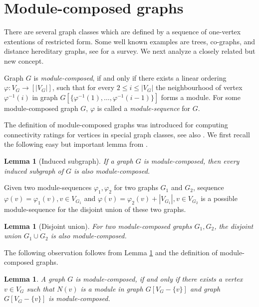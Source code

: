 \documentclass[11pt]{article}
\newtheorem{lemma}[theorem]{Lemma}
\begin{document}
\section{Module-composed graphs}



There are several graph classes which are defined by a sequence of one-vertex
extentions of restricted form. Some well known examples are trees, co-graphs,
and distance hereditary graphs, see \cite{Rao07} for a survey. We next analyze
a closely related but new concept.

Graph $G$ is {\em module-composed}, if and only if there exists a linear 
ordering $\varphi:V_G \to [|V_G|]$, such that for every $2\leq i\leq|V_G|$ the 
neighbourhood of vertex $\varphi^{-1}(i)$ in graph 
$G[\{\varphi^{-1}(1),\ldots,\varphi^{-1}(i-1)\}]$ forms a module. 
For some module-composed graph $G$, $\varphi$ is called a {\em module-sequence} for $G$.

The definition of module-composed graphs
was introduced \cite{AGKKW06} for computing
connectivity ratings for vertices in special graph classes, 
see also \cite{AKKW06}.
We first recall the following easy but important lemma from \cite{AGKKW06}.

\begin{lemma}[Induced subgraph]\label{Li}
If a graph $G$ is module-composed, then every induced subgraph of $G$ is also 
module-composed.
\end{lemma}

Given two module-sequences $\varphi_1,\varphi_2$ for two graphs $G_1$ and $G_2$, 
sequence $\varphi(v)=\varphi_1(v), v\in V_{G_1}$ and $\varphi(v)=\varphi_2(v)+|V_{G_1}|, v\in V_{G_2}$ is a possible module-sequence for the disjoint union of these two graphs.

\begin{lemma}[Disjoint union]\label{Ld}
For two module-composed graphs $G_1,G_2$, the disjoint union  $G_1\cup G_2$ is also 
module-composed.
\end{lemma}


The following observation follows from Lemma \ref{Li} and the definition of 
module-composed graphs.

\begin{lemma} \label{Lx}
A graph $G$ is  module-composed, if and only if there exists a
vertex $v\in V_G$ such that $N(v)$ is a module in graph $G[V_G-\{v\}]$ and graph $G[V_G-\{v\}]$ 
is module-composed.
\end{lemma}
\end{document}
